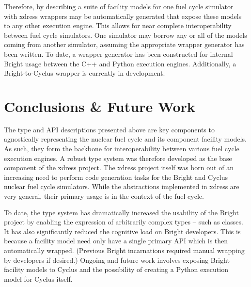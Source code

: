 \documentclass{ansconfpaper}
\begin{document}
Therefore, by describing a suite of facility models for one fuel cycle simulator with
xdress wrappers may be automatically generated that expose these models to any
other execution engine.  This allows for near complete interoperability between 
fuel cycle simulators.  One simulator may borrow any or all of the models coming 
from another simulator, assuming the appropriate wrapper generator has been written.
To date, a wrapper generator has been constructed for internal Bright usage between
the C++ and Python execution engines.  Additionally, a Bright-to-Cyclus wrapper is 
currently in development.

\section{Conclusions \& Future Work}
\label{sec:conc}

The type and API descriptions presented above are key components to agnostically
representing the nuclear fuel cycle and its component facility models.  As such,
they form the backbone for interoperability between various fuel cycle execution 
engines.  A robust type system was therefore developed as the base component of 
the xdress project.  The xdress project itself was born out of an increasing need 
to perform code generation tasks for the Bright and Cyclus nuclear fuel cycle 
simulators.  While the abstractions implemented in xdress are very general, their 
primary usage is in the context of the fuel cycle.  

To date, the type system has dramatically increased the usability of the Bright
project by enabling the expression of arbitrarily complex types -- such as classes.
It has also significantly reduced the cognitive load on Bright developers.  This 
is because a facility model need only have a single primary API which is then 
automatically wrapped. (Previous Bright incarnations required manual wrapping by
developers if desired.)  Ongoing and future work involves exposing Bright facility
models to Cyclus and the possibility of creating a Python 
execution model for Cyclus itself.

\setlength{\baselineskip}{12pt}



\end{document}
